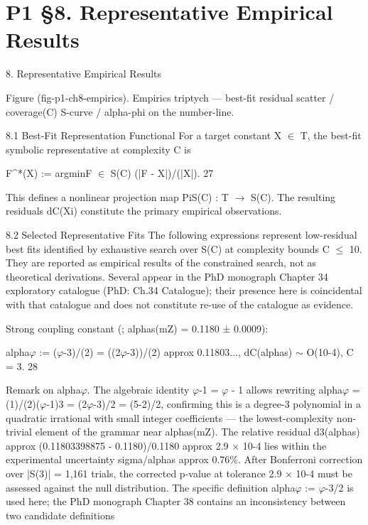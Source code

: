 
\section{P1 §8. Representative Empirical Results}

8. Representative Empirical Results

   Figure (fig-p1-ch8-empirics). Empirics triptych --- best-fit residual scatter / coverage(C) S-curve /
                                    alpha-phi on the number-line.

  8.1 Best-Fit Representation Functional
  For a target constant X $\in$ T, the best-fit symbolic representative at complexity C is

  F\textasciicircum{}*(X) := argminF $\in$ S(C) (|F - X|)/(|X|). 27

  This defines a nonlinear projection map PiS(C) : T $\rightarrow$ S(C). The resulting residuals
  {dC(Xi)} constitute the primary empirical observations.

  8.2 Selected Representative Fits
  The following expressions represent low-residual best fits identified by exhaustive
  search over S(C) at complexity bounds C $\leq$ 10. They are reported as empirical results of
  the constrained search, not as theoretical derivations. Several appear in the PhD
  monograph Chapter 34 exploratory catalogue (PhD: Ch.34 Catalogue); their presence
  here is coincidental with that catalogue and does not constitute re-use of the catalogue
  as evidence.

  Strong coupling constant (\citealp{pdg2024}; alphas(mZ) = 0.1180 ± 0.0009):

  alpha$\varphi$ := ($\varphi$-3)/(2) = ((2$\varphi$-3))/(2) approx 0.11803..., dC(alphas) $\sim$ O(10-4), C = 3. 28

  Remark on alpha$\varphi$. The algebraic identity $\varphi$-1 = $\varphi$ - 1 allows rewriting alpha$\varphi$ =
  (1)/(2)($\varphi$-1)3 = (2$\varphi$-3)/2 = (5-2)/2, confirming this is a degree-3 polynomial in a
  quadratic irrational with small integer coefficients --- the lowest-complexity non-trivial
  element of the grammar near alphas(mZ). The relative residual d3(alphas) approx
  (0.11803398875 - 0.1180)/0.1180 approx 2.9 $\times$ 10-4 lies within the experimental
  uncertainty sigma/alphas approx 0.76\%. After Bonferroni correction over |S(3)| =
  1{,}161 trials, the corrected p-value at tolerance 2.9 $\times$ 10-4 must be assessed against
  the null distribution. The specific definition alpha$\varphi$ := $\varphi$-3/2 is used here; the PhD
  monograph Chapter 38 contains an inconsistency between two candidate definitions

